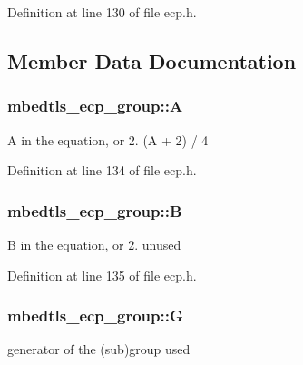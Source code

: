 Definition at line 130 of file ecp.\-h.



\subsection{Member Data Documentation}
\hypertarget{structmbedtls__ecp__group_af6ab87eb277c78f786ca58ed3fd78825}{
\subsubsection[{A}]{ mbedtls\-\_\-ecp\-\_\-group\-::\-A}}\label{structmbedtls__ecp__group_af6ab87eb277c78f786ca58ed3fd78825}

\begin{DoxyEnumerate}
\item A in the equation, or 2. (A + 2) / 4 
\end{DoxyEnumerate}

Definition at line 134 of file ecp.\-h.

\hypertarget{structmbedtls__ecp__group_ab54c9e6b1807d5c10db76f7ebedd55f4}{
\subsubsection[{B}]{ mbedtls\-\_\-ecp\-\_\-group\-::\-B}}\label{structmbedtls__ecp__group_ab54c9e6b1807d5c10db76f7ebedd55f4}

\begin{DoxyEnumerate}
\item B in the equation, or 2. unused 
\end{DoxyEnumerate}

Definition at line 135 of file ecp.\-h.

\hypertarget{structmbedtls__ecp__group_a7e0aca0789ca8f5c38d3a0c98b2f9809}{
\subsubsection[{G}]{ mbedtls\-\_\-ecp\-\_\-group\-::\-G}}\label{structmbedtls__ecp__group_a7e0aca0789ca8f5c38d3a0c98b2f9809}
generator of the (sub)group used 

